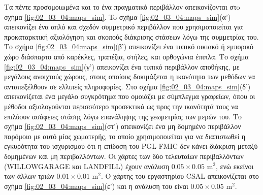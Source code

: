 Τα πέντε προσομοιωμένα και το ένα πραγματικό περιβάλλον απεικονίζονται στo
σχήμα \ref{fig:02_03_04:maps_sim}. To σχήμα \ref{fig:02_03_04:maps_sim}(α')
απεικονίζει ένα απλό και σχεδόν συμμετρικό περιβάλλον που χρησιμοποιείται για
προκαταρκτική αξιολόγηση και σκοπούς διάκρισης στάσεων λόγω της συμμετρίας του.
Το σχήμα \ref{fig:02_03_04:maps_sim}(β') απεικονίζει ένα τυπικό οικιακό ή
εμπορικό χώρο διάσπαρτο από καρέκλες, τραπέζια, στήλες, και ορθογώνια έπιπλα.
Το σχήμα \ref{fig:02_03_04:maps_sim}(γ') απεικονίζει ένα τυπικό περιβάλλον
αποθήκης, με μεγάλους ανοιχτούς χώρους, στους οποίους δοκιμάζεται η ικανότητα
των μεθόδων να ανταπεξέλθουν σε ελλιπείς πληροφορίες. Στο σχήμα
\ref{fig:02_03_04:maps_sim}(δ') απεικονίζεται ένα μεγάλο συγκρότημα που
ομοιάζει με σύμπλεγμα γραφείων, όπου οι μέθοδοι αξιολογούνται περισσότερο
προσεκτικά ως προς την ικανότητά τους να επιλύουν ασάφειες στάσης λόγω
επανάληψης της γεωμετρίας των μερών του. Το σχήμα
\ref{fig:02_03_04:maps_sim}(στ') απεικονίζει ένα μη δομημένο περιβάλλον
παρόμοιο με αυτό μίας χωματερής, το οποίο χρησιμοποιείται για να διαπιστωθεί η
εγκυρότητα του ισχυρισμού ότι η επίδοση του PGL-FMIC δεν κάνει διάκριση μεταξύ
δομημένων και μη περιβαλλόντων. Οι χάρτες των δύο τελευταίων περιβαλλόντων
(WILLOWGARAGE και LANDFILL) έχουν ανάλυση $0.05\times0.05$ m$^2$, ενώ εκείνοι
των άλλων τριών $0.01\times0.01$ m$^2$. Ο χάρτης του εργαστηρίου CSAL
απεικονίζεται στο σχήμα \ref{fig:02_03_04:maps_sim}(ε') και η ανάλυση του είναι
$0.05\times0.05$ m$^2$.


